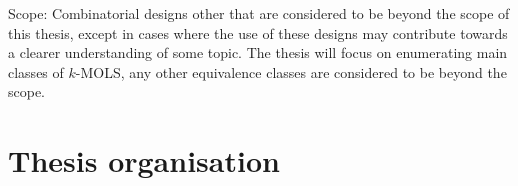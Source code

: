 Scope:
Combinatorial designs other that \lat are considered to be beyond the scope of this thesis, except in cases where the use of these designs may contribute towards a clearer understanding of some topic.
The thesis will focus on enumerating main classes of $k$-MOLS, any other equivalence classes are considered to be beyond the scope.


\section{Thesis organisation}
